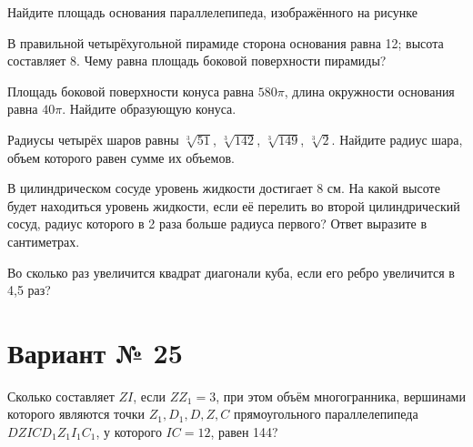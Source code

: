 \documentclass[4apaper]{article}
\begin{document}
\begin{taskBN}{1}
Найдите площадь основания параллелепипеда, изображённого на рисунке
\end{taskBN}
\vspace*{1cm}

\begin{taskBN}{2}
В правильной четырёхугольной пирамиде сторона основания равна 12; высота составляет 8. Чему равна площадь боковой поверхности пирамиды?
\end{taskBN}

\begin{taskBN}{3}
Площадь боковой поверхности конуса равна $580\pi$, длина окружности основания равна $40\pi$. Найдите образующую конуса. 
\end{taskBN}

\begin{taskBN}{4}
Радиусы четырёх шаров равны $\sqrt[3]{51}$, $\sqrt[3]{142}$, $\sqrt[3]{149}$, $\sqrt[3]{2}$. Найдите радиус шара, объем которого равен сумме их объемов.
\end{taskBN}

\begin{taskBN}{5}
В цилиндрическом сосуде уровень жидкости достигает 8 см. На какой высоте будет находиться уровень жидкости, если её перелить во второй цилиндрический сосуд, радиус которого в 2 раза больше радиуса первого? Ответ выразите в сантиметрах.
\end{taskBN}

\begin{taskBN}{6}
Во сколько раз увеличится квадрат диагонали куба, если его ребро увеличится в 4,5 раз?
\end{taskBN}
\newpage\section*{Вариант № 25}

\begin{taskBN}{1}
Сколько составляет  $ZI$, если $ZZ_1=3$, при этом объём многогранника, вершинами которого являются точки $Z_1,D_1,D,Z,C$ прямоугольного параллелепипеда $DZICD_1Z_1I_1C_1$, у которого $IC = 12$, равен 144? 
\end{taskBN}
\end{document}
